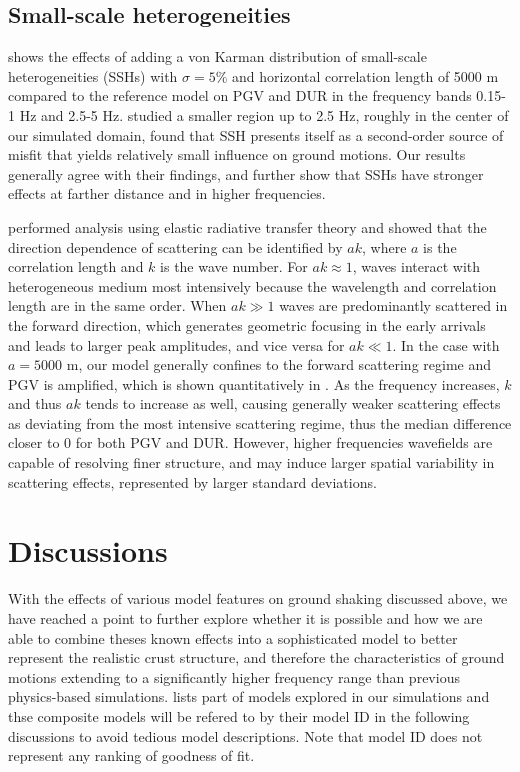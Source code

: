\subsection{Small-scale heterogeneities}
 shows the effects of adding a von Karman distribution of small-scale heterogeneities (SSHs) with $\sigma = 5\%$ and horizontal correlation length of 5000 m compared to the reference model on PGV and DUR in the frequency bands 0.15-1 Hz and 2.5-5 Hz. \citet{savranGroundMotionSimulation2019} studied a smaller region up to 2.5 Hz, roughly in the center of our simulated domain, found that SSH presents itself as a second-order source of misfit that yields relatively small influence on ground motions. Our results generally agree with their findings, and further show that SSHs have stronger effects at farther distance and in higher frequencies.

\citet{przybillaEstimationCrustalScattering2009} performed analysis using elastic radiative transfer theory and showed that the direction dependence of scattering can be identified by $ak$, where $a$ is the correlation length and $k$ is the wave number. For $ak \approx 1$, waves interact with heterogeneous medium most intensively because the wavelength and correlation length are in the same order. When $ak\gg 1$ waves are predominantly scattered in the forward direction, which generates geometric focusing in the early arrivals and leads to larger peak amplitudes, and vice versa for $ak \ll 1$. In the case with $a=5000$ m, our model generally confines to the forward scattering regime and PGV is amplified, which is shown quantitatively in . As the frequency increases, $k$ and thus $ak$ tends to increase as well, causing generally weaker scattering effects as deviating from the most intensive scattering regime, thus the median difference closer to 0 for both PGV and DUR. However, higher frequencies wavefields are capable of resolving finer structure, and may induce larger spatial variability in scattering effects, represented by larger standard deviations.


\section{Discussions}
With the effects of various model features on ground shaking discussed above, we have reached a point to further explore whether it is possible and how we are able to combine theses known effects into a sophisticated model to better represent the realistic crust structure, and therefore the characteristics of ground motions extending to a significantly higher frequency range than previous physics-based simulations.  lists part of models explored in our simulations and thse composite models will be refered to by their model ID in the following discussions to avoid tedious model descriptions. Note that model ID does not represent any ranking of goodness of fit.

